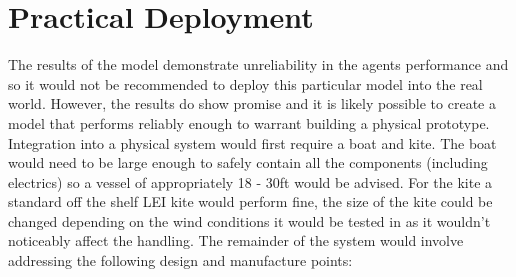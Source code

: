 \section{Practical Deployment}\label{sec:practical_deployment}
The results of the model demonstrate unreliability in the agents performance and so it would not be recommended to deploy this particular model into the real world. However, the results do show promise and it is likely possible to create a model that performs reliably enough to warrant building a physical prototype. Integration into a physical system would first require a boat and kite. The boat would need to be large enough to safely contain all the components (including electrics) so a vessel of appropriately 18 - 30ft would be advised. For the kite a standard off the shelf LEI kite would perform fine, the size of the kite could be changed depending on the wind conditions it would be tested in as it wouldn't noticeably affect the handling. The remainder of the system would involve addressing the following design and manufacture points:  

